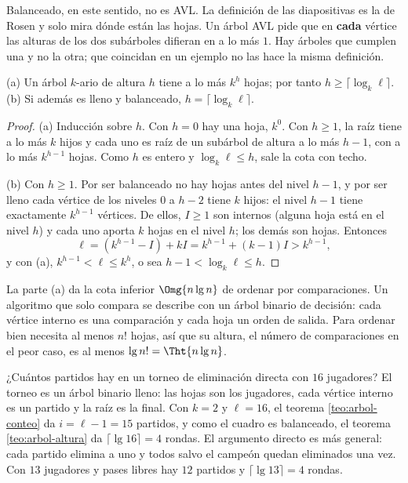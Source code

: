 \documentclass[11pt,letterpaper]{article}
\begin{document}
\begin{ojo}
  Balanceado, en este sentido, no es AVL. La definición de las
  diapositivas es la de Rosen y solo mira dónde están las hojas. Un
  árbol AVL pide que en \textbf{cada} vértice las alturas de los dos
  subárboles difieran en a lo más $1$. Hay árboles que cumplen una y
  no la otra; que coincidan en un ejemplo no las hace la misma
  definición.
\end{ojo}

\begin{teorema}
  \label{teo:arbol-altura}
  (a) Un árbol $k$-ario de altura $h$ tiene a lo más $k^h$ hojas;
  por tanto $h \ge \lceil \log_k \ell \rceil$. (b) Si además es lleno
  y balanceado, $h = \lceil \log_k \ell \rceil$.
\end{teorema}

\begin{proof}
  (a) Inducción sobre $h$. Con $h = 0$ hay una hoja, $k^0$. Con
  $h \ge 1$, la raíz tiene a lo más $k$ hijos y cada uno es raíz de un
  subárbol de altura a lo más $h - 1$, con a lo más $k^{h-1}$ hojas.
  Como $h$ es entero y $\log_k \ell \le h$, sale la cota con techo.

  (b) Con $h \ge 1$. Por ser balanceado no hay hojas antes del nivel
  $h - 1$, y por ser lleno cada vértice de los niveles $0$ a $h - 2$
  tiene $k$ hijos: el nivel $h - 1$ tiene exactamente $k^{h-1}$
  vértices. De ellos, $I \ge 1$ son internos (alguna hoja está en el
  nivel $h$) y cada uno aporta $k$ hojas en el nivel $h$; los demás
  son hojas. Entonces
  \[
    \ell = (k^{h-1} - I) + kI = k^{h-1} + (k - 1)I > k^{h-1} ,
  \]
  y con (a), $k^{h-1} < \ell \le k^h$, o sea
  $h - 1 < \log_k \ell \le h$.
\end{proof}

\begin{observacion}
  La parte (a) da la cota inferior $\Omg{n \lg n}$ de ordenar por
  comparaciones. Un algoritmo que solo compara se describe con un
  árbol binario de decisión: cada vértice interno es una comparación y
  cada hoja un orden de salida. Para ordenar bien necesita al menos
  $n!$ hojas, así que su altura, el número de comparaciones en el peor
  caso, es al menos $\lg n! = \Tht{n \lg n}$.
\end{observacion}

\begin{ejemplo}
  \label{ej:arbol-torneo}
  ¿Cuántos partidos hay en un torneo de eliminación directa con $16$
  jugadores? El torneo es un árbol binario lleno: las hojas son los
  jugadores, cada vértice interno es un partido y la raíz es la
  final. Con $k = 2$ y $\ell = 16$, el teorema \ref{teo:arbol-conteo}
  da $i = \ell - 1 = 15$ partidos, y como el cuadro es balanceado, el
  teorema \ref{teo:arbol-altura} da $\lceil \lg 16 \rceil = 4$ rondas.
  El argumento directo es más general: cada partido elimina a uno y
  todos salvo el campeón quedan eliminados una vez. Con $13$ jugadores
  y pases libres hay $12$ partidos y $\lceil \lg 13 \rceil = 4$
  rondas.
\end{ejemplo}
\end{document}
